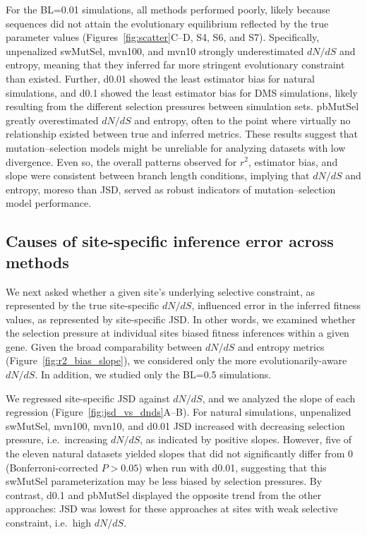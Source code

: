 \documentclass[11pt]{article}
\begin{document}
For the BL=0.01 simulations, all methods performed poorly, likely because sequences did not attain the evolutionary equilibrium reflected by the true parameter values (Figures~\ref{fig:scatter}C--D, S4, S6, and S7). Specifically, unpenalized swMutSel, mvn100, and mvn10 strongly underestimated $dN/dS$ and entropy, meaning that they inferred far more stringent evolutionary constraint than existed. Further, d0.01 showed the least estimator bias for natural simulations, and d0.1 showed the least estimator bias for DMS simulations, likely resulting from the different selection pressures between simulation sets. pbMutSel greatly overestimated $dN/dS$ and entropy, often to the point where virtually no relationship existed between true and inferred metrics. These results suggest that mutation--selection models might be unreliable for analyzing datasets with low divergence. Even so, the overall patterns observed for $r^2$, estimator bias, and slope were consistent between branch length conditions, implying that $dN/dS$ and entropy, moreso than JSD, served as robust indicators of mutation--selection model performance.





\subsection*{Causes of site-specific inference error across methods}

We next asked whether a given site's underlying selective constraint, as represented by the true site-specific $dN/dS$, influenced error in the inferred fitness values, as represented by site-specific JSD. In other words, we examined whether the selection pressure at individual sites biased fitness inferences within a given gene. Given the broad comparability between $dN/dS$ and entropy metrics (Figure~\ref{fig:r2_bias_slope}), we considered only the more evolutionarily-aware $dN/dS$. In addition, we studied only the BL=0.5 simulations.

We regressed site-specific JSD against $dN/dS$, and we analyzed the slope of each regression (Figure~\ref{fig:jsd_vs_dnds}A--B). For natural simulations, unpenalized swMutSel, mvn100, mvn10, and d0.01 JSD increased with decreasing selection pressure, i.e.\ increasing $dN/dS$, as indicated by positive slopes. However, five of the eleven natural datasets yielded slopes that did not significantly differ from 0 (Bonferroni-corrected $P>0.05$) when run with d0.01, suggesting that this swMutSel parameterization may be less biased by selection pressures. By contrast, d0.1 and pbMutSel displayed the opposite trend from the other approaches: JSD was lowest for these approaches at sites with weak selective constraint, i.e.\ high $dN/dS$.
\end{document}
